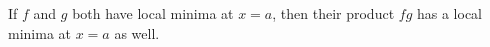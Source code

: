 \documentclass{ximera}
\author{Steven Gubkin}
\begin{document}
\begin{exercise}

	If $f$ and $g$ both have local minima at $x=a$, then their product $fg$ has a local minima at $x=a$ as well.

	\begin{multipleChoice}	
	\end{multipleChoice}

\end{exercise}
\end{document}
